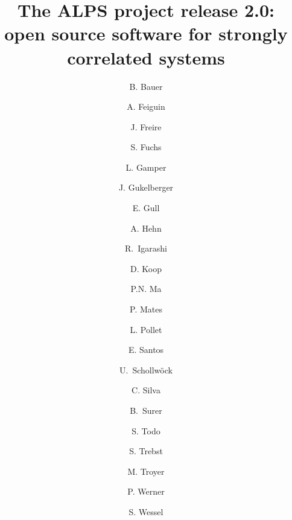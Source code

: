 \documentclass[3p,twocolumn]{elsarticle}
\begin{document}
\begin{frontmatter}

\title{The ALPS project release 2.0: \\ open source software for strongly correlated systems}

\author[eth]{B. Bauer} 
\author[wyoming]{A. Feiguin} 
\author[utah]{J. Freire} 
\author[goettingen]{S. Fuchs} 
\author[eth]{L. Gamper} 
\author[eth]{J. Gukelberger} 
\author[columbia]{E. Gull} 
\author[eth]{A. Hehn} 
\author[japan]{R.~Igarashi} 
\author[utah]{D. Koop} 
\author[eth]{P.N. Ma} 
\author[eth,utah]{P. Mates} 
\author[harvard,eth]{L. Pollet} 
\author[brazil,utah]{E. Santos} 
\author[lmu]{U.~Schollw\"ock} 
\author[utah]{C. Silva} 
\author[eth]{B.~Surer} 
\author[tokyo]{S. Todo} 
\author[stationq]{S. Trebst} 
\author[eth]{M. Troyer}
\author[eth]{P. Werner} 
\author[rwth,stuttgart]{S. Wessel} 

\address[eth]{Theoretische Physik, ETH Zurich, 8093 Zurich, Switzerland}
\address[wyoming]{}
\address[utah]{}
\address[goettingen]{Institut f\"ur Theoretische Physik, Georg-August-Universit\"{a}t G\"{o}ttingen, G\"{o}ttingen, Germany}
\address[columbia]{Columbia University, New York, NY 10027, USA}
\address[harvard]{} 
\address[brazil]{} 
\address[lmu]{}
\address[tokyo]{Department of Applied Physics, University of Tokyo, 113-8656 Tokyo, Japan}
\address[stationq]{Microsoft Research, Station Q, University of California, Santa Barbara, CA 93106, USA}
\address[rwth]{}
\address[stuttgart]{Institut f\"ur Theoretische Physik III, Universit\"at Stuttgart, Pfaffenwaldring 57, D-70550 Stuttgart, Germany}


\end{frontmatter}
\end{document}

